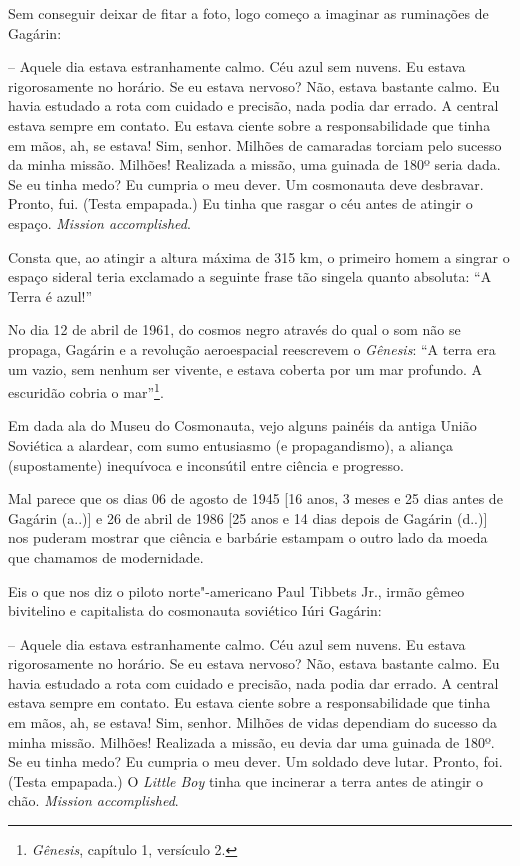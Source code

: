 Sem conseguir deixar de fitar a foto, logo começo a imaginar as
ruminações de Gagárin:

-- Aquele dia estava estranhamente calmo. Céu azul sem nuvens. Eu estava
rigorosamente no horário. Se eu estava nervoso? Não, estava bastante
calmo. Eu havia estudado a rota com cuidado e precisão, nada podia dar
errado. A central estava sempre em contato. Eu estava ciente sobre a
responsabilidade que tinha em mãos, ah, se estava! Sim, senhor. Milhões
de camaradas torciam pelo sucesso da minha missão. Milhões! Realizada a
missão, uma guinada de 180º seria dada. Se eu tinha medo? Eu cumpria o
meu dever. Um cosmonauta deve desbravar. Pronto, fui. (Testa empapada.)
Eu tinha que rasgar o céu antes de atingir o espaço. \emph{Mission
accomplished}.

Consta que, ao atingir a altura máxima de 315 km, o primeiro homem a
singrar o espaço sideral teria exclamado a seguinte frase tão singela
quanto absoluta: ``A Terra é azul!''

No dia 12 de abril de 1961, do cosmos negro através do qual o som não se
propaga, Gagárin e a revolução aeroespacial reescrevem o \emph{Gênesis}:
``A terra era um vazio, sem nenhum ser vivente, e estava coberta por um
mar profundo. A escuridão cobria o mar''\footnote{\emph{Gênesis},
  capítulo 1, versículo 2.}.

Em dada ala do Museu do Cosmonauta, vejo alguns painéis da antiga União
Soviética a alardear, com sumo entusiasmo (e propagandismo), a aliança
(supostamente) inequívoca e inconsútil entre ciência e progresso.

Mal parece que os dias 06 de agosto de 1945 {[}16 anos, 3 meses e 25
dias antes de Gagárin (a..){]} e 26 de abril de 1986 {[}25 anos e 14
dias depois de Gagárin (d..){]} nos puderam mostrar que ciência e
barbárie estampam o outro lado da moeda que chamamos de modernidade.

Eis o que nos diz o piloto norte"-americano Paul Tibbets Jr., irmão gêmeo
bivitelino e capitalista do cosmonauta soviético Iúri Gagárin:

-- Aquele dia estava estranhamente calmo. Céu azul sem nuvens. Eu estava
rigorosamente no horário. Se eu estava nervoso? Não, estava bastante
calmo. Eu havia estudado a rota com cuidado e precisão, nada podia dar
errado. A central estava sempre em contato. Eu estava ciente sobre a
responsabilidade que tinha em mãos, ah, se estava! Sim, senhor. Milhões
de vidas dependiam do sucesso da minha missão. Milhões! Realizada a
missão, eu devia dar uma guinada de 180º. Se eu tinha medo? Eu cumpria o
meu dever. Um soldado deve lutar. Pronto, foi. (Testa empapada.) O
\emph{Little Boy} tinha que incinerar a terra antes de atingir o chão.
\emph{Mission accomplished}.

